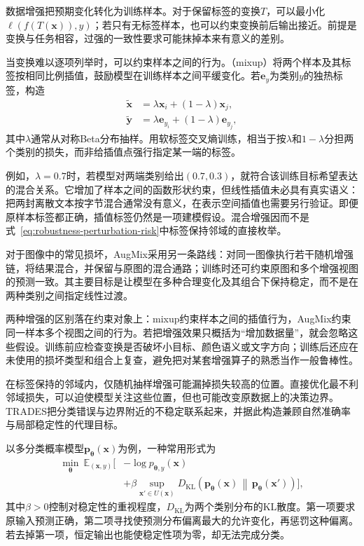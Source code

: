 数据增强把预期变化转化为训练样本。对于保留标签的变换$T$，可以最小化$\ell(f(T(\bm{x})),y)$；若只有无标签样本，也可以约束变换前后输出接近。前提是变换与任务相容，过强的一致性要求可能抹掉本来有意义的差别。

当变换难以逐项列举时，可以约束样本之间的行为。（mixup）将两个样本及其标签按相同比例插值，鼓励模型在训练样本之间平缓变化。若$\bm{e}_{y}$为类别$y$的独热标签，构造
\begin{equation}
 \begin{aligned}
  \widetilde{\bm{x}}&=\lambda\bm{x}_i+(1-\lambda)\bm{x}_j,\\
  \widetilde{\bm{y}}&=\lambda\bm{e}_{y_i}
                         +(1-\lambda)\bm{e}_{y_j},
 \end{aligned}
 \label{eq:robustness-mixup}
\end{equation}
其中$\lambda$通常从对称Beta分布抽样。用软标签交叉熵训练，相当于按$\lambda$和$1-\lambda$分担两个类别的损失，而非给插值点强行指定某一端的标签。

例如，$\lambda=0.7$时，若模型对两端类别给出$(0.7,0.3)$，就符合该训练目标希望表达的混合关系。它增加了样本之间的函数形状约束，但线性插值未必具有真实语义：把两封离散文本按字节混合通常没有意义，在表示空间插值也需要另行验证。即便原样本标签都正确，插值标签仍然是一项建模假设。混合增强因而不是式~\eqref{eq:robustness-perturbation-risk}中标签保持邻域的直接枚举。

对于图像中的常见损坏，AugMix采用另一条路线：对同一图像执行若干随机增强链，将结果混合，并保留与原图的混合通路；训练时还可约束原图和多个增强视图的预测一致。其主要目标是让模型在多种合理变化及其组合下保持稳定，而不是在两种类别之间指定线性过渡。

两种增强的区别落在约束对象上：mixup约束样本之间的插值行为，AugMix约束同一样本多个视图之间的行为。若把增强效果只概括为“增加数据量”，就会忽略这些假设。训练前应检查变换是否破坏小目标、颜色语义或文字方向；训练后还应在未使用的损坏类型和组合上复查，避免把对某套增强算子的熟悉当作一般鲁棒性。

在标签保持的邻域内，仅随机抽样增强可能漏掉损失较高的位置。直接优化最不利邻域损失，可以迫使模型关注这些位置，但也可能改变原数据上的决策边界。TRADES把分类错误与边界附近的不稳定联系起来，并据此构造兼顾自然准确率与局部稳定性的代理目标。

以多分类概率模型$\bm{p}_{\bm{\theta}}(\bm{x})$为例，一种常用形式为
\begin{equation}
 \begin{aligned}
 \min_{\bm{\theta}}\ \mathbb E_{(\bm{x},y)}
 \bigg[&-\log p_{\bm{\theta},y}(\bm{x})\\
 &+\beta\sup_{\bm{x}'\in U(\bm{x})}
 D_{\mathrm{KL}}\!\left(
 \bm{p}_{\bm{\theta}}(\bm{x})
 \,\middle\|\,
 \bm{p}_{\bm{\theta}}(\bm{x}')\right)\bigg],
 \end{aligned}
 \label{eq:robustness-trades}
\end{equation}
其中$\beta>0$控制对稳定性的重视程度，$D_{\mathrm{KL}}$为两个类别分布的KL散度。第一项要求原输入预测正确，第二项寻找使预测分布偏离最大的允许变化，再惩罚这种偏离。若去掉第一项，恒定输出也能使稳定性项为零，却无法完成分类。

